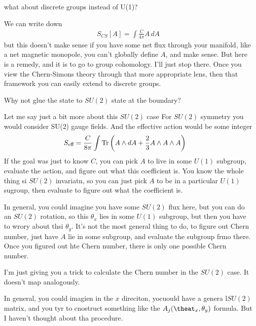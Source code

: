 \begin{question}
    what about discrete groups instead of U(1)?
\end{question}
We can write down
\begin{align}
    S_{CS}[A] = \int \frac{C}{4\pi} A\, dA
\end{align}
but this doesn't make sense if you have some net flux through your manifold,
like a net magnetic monopole,
you can't globally define $A$,
and make sense.
But here is a remedy,
and it is to go to group cohomology.
I'll just stop there.
Once you view the Chern-Simons theory through that more appropriate lens,
then that framework you can easily extend to discrete groups.

\begin{question}
    Why not glue the state to $SU(2)$ state at the boundary?
\end{question}
Let me say just a bit more about this $SU(2)$ case
For $SU(2)$ symmetry
you would consider SU(2) gauge fields.
And the effective action would be some integer
\begin{align}
    S_{\text{eff}} &=
    \frac{C}{8\pi}
    \int \Tr\left( 
    A\wedge dA
    + \frac{2}{3} A \wedge A \wedge A
    \right)
\end{align}
If the goal was just to know $C$,
you can pick $A$ to live in some $U(1)$ subgroup,
evaluate the action,
and figure out what this coefficient is.
You know the whole thing si $SU(2)$ invariatn,
so you can just pick $A$ to be in a particular $U(1)$ sugroup,
then evaluate to figure out what the coefficient is.

In general,
you could imagine you have some $SU(2)$ flux here,
but you can do an $SU(2)$ rotation,
so this $\theta_x$ lies in some $U(1)$ subgroup,
but then you have to wrory about thsi $\theta_y$.
It's not the most general thing to do,
to figure out Chern number,
just have $A$ lie in some subgroup,
and evaluate the subgroup frmo there.
Once you figured out hte Chern number,
there is only one possible Chern number.

I'm just giving you a trick to calculate the Chern number in the $SU(2)$ case.
It doesn't map analogously.

In general,
you could imagien in the $x$ direciton,
yocuould have a genera l$SU(2)$ matrix,
and you tyr to cnostruct something like the $A_j(\theat_x,\theta_y)$ formula.
But I haven't thought about tha procedure.

